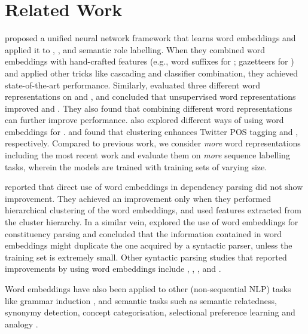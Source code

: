 \section{Related Work}

 proposed a unified neural network framework
that learns word embeddings and applied it to \pos, \chunking, \ner and semantic role labelling. 
When they combined word embeddings with hand-crafted features
(e.g., word suffixes for \pos;  gazetteers for \ner) and applied other
tricks like cascading and classifier combination, they achieved state-of-the-art performance.
Similarly,  evaluated three different word representations on \ner and \chunking, and concluded that unsupervised word representations improved \ner and \chunking. They also found that combining different word representations can further improve performance.  also explored different ways of using word embeddings for \ner.   and  found that \brown clustering enhances Twitter POS tagging and \mwe, respectively. Compared to previous work, we consider \textit{more} word representations including the most recent work and evaluate them on \textit{more} sequence labelling tasks, wherein the models are trained with training sets of varying size.

 reported that direct use of word embeddings in dependency parsing did not show improvement. They achieved an improvement only when they performed hierarchical clustering of the word embeddings, and used features extracted from the cluster hierarchy.
In a similar vein,  explored the use of word embeddings for constituency parsing and concluded that the
information contained in word embeddings might duplicate the one acquired by a
syntactic parser, unless the training set is extremely small.
Other syntactic parsing studies that reported improvements by using
word embeddings include , ,
,  and .

Word embeddings have also been applied to other (non-sequential NLP)
tasks like grammar induction \cite{Spitkovsky:2011}, and semantic tasks
such as semantic relatedness, synonymy detection, concept
categorisation, selectional preference learning and analogy \cite{baroni:2014,Levy:2014,Levy:2015}.


